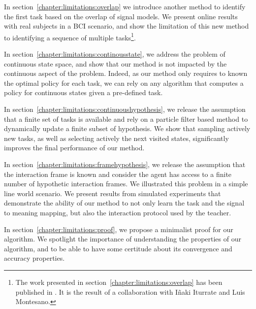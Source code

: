 In section~\ref{chapter:limitations:overlap} we introduce another method to identify the first task based on the overlap of signal models. We present online results with real subjects in a BCI scenario, and show the limitation of this new method to identifying a sequence of multiple tasks\footnote{The work presented in section~\ref{chapter:limitations:overlap} has been published in \cite{grizou2014calibration}. It is the result of a collaboration with I{\~n}aki Iturrate and Luis Montesano.}.

In section~\ref{chapter:limitations:continousstate}, we address the problem of continuous state space, and show that our method is not impacted by the continuous aspect of the problem. Indeed, as our method only requires to known the optimal policy for each task, we can rely on any algorithm that computes a policy for continuous states given a pre-defined task.

In section~\ref{chapter:limitations:continuoushypothesis}, we release the assumption that a finite set of tasks is available and rely on a particle filter based method to dynamically update a finite subset of hypothesis. We show that sampling actively new tasks, as well as selecting actively the next visited states, significantly improves the final performance of our method.

In section~\ref{chapter:limitations:framehypothesis}, we release the assumption that the interaction frame is known and consider the agent has access to a finite number of hypothetic interaction frames. We illustrated this problem in a simple line world scenario. We present results from simulated experiments that demonstrate the ability of our method to not only learn the task and the signal to meaning mapping, but also the interaction protocol used by the teacher.

In section~\ref{chapter:limitations:proof}, we propose a minimalist proof for our algorithm. We spotlight the importance of understanding the properties of our algorithm, and to be able to have some certitude about its convergence and accuracy properties.


\newpage

\newpage

\newpage
% 

\newpage

\newpage

\newpage
% 

\newpage

